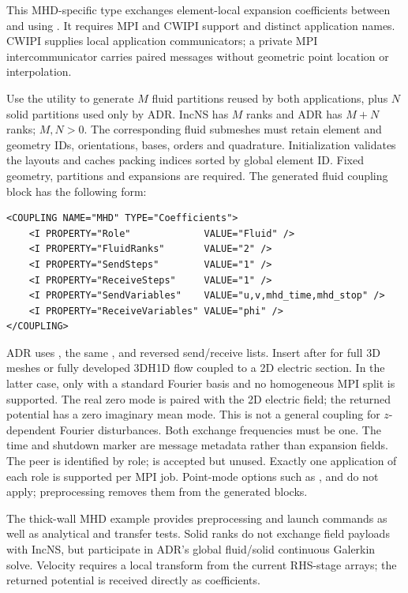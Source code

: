 This MHD-specific type exchanges element-local expansion coefficients between
 and  using
. It requires MPI and CWIPI support and distinct
 application names. CWIPI supplies local application
communicators; a private MPI intercommunicator carries paired messages without
geometric point location or interpolation.

Use the  utility to generate $M$ fluid partitions reused by
both applications, plus $N$ solid partitions used only by ADR. IncNS has $M$
ranks and ADR has $M+N$ ranks; $M,N>0$. The corresponding fluid submeshes must
retain element and geometry IDs, orientations, bases, orders and quadrature.
Initialization validates the layouts and caches packing indices sorted by
global element ID. Fixed geometry, partitions and expansions are required.
The generated fluid coupling block has the following form:
\begin{lstlisting}[style=XMLStyle]
<COUPLING NAME="MHD" TYPE="Coefficients">
    <I PROPERTY="Role"             VALUE="Fluid" />
    <I PROPERTY="FluidRanks"       VALUE="2" />
    <I PROPERTY="SendSteps"        VALUE="1" />
    <I PROPERTY="ReceiveSteps"     VALUE="1" />
    <I PROPERTY="SendVariables"    VALUE="u,v,mhd_time,mhd_stop" />
    <I PROPERTY="ReceiveVariables" VALUE="phi" />
</COUPLING>
\end{lstlisting}
ADR uses , the same , and reversed
send/receive lists. Insert  after  for full 3D meshes or
fully developed 3DH1D flow coupled to a 2D electric section. In the latter case,
only  with a standard Fourier basis and no homogeneous MPI
split is supported. The real zero mode is paired with the 2D electric field;
the returned potential has a zero imaginary mean mode. This is not a general
coupling for $z$-dependent Fourier disturbances.
Both exchange frequencies must be one. The time and shutdown marker are
message metadata rather than expansion fields. The peer is identified by role;
 is accepted but unused. Exactly one application of each role
is supported per MPI job. Point-mode options such as ,
 and  do not apply; preprocessing removes
them from the generated blocks.

The thick-wall MHD example provides preprocessing and launch commands as well
as analytical and transfer tests. Solid ranks do not exchange field payloads
with IncNS, but participate in ADR's global fluid/solid continuous Galerkin
solve. Velocity requires a local transform from the current RHS-stage arrays;
the returned potential is received directly as coefficients.

